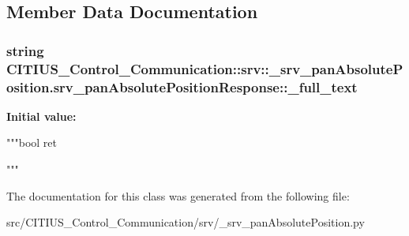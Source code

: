 \subsection{\-Member \-Data \-Documentation}
\hypertarget{class_c_i_t_i_u_s___control___communication_1_1srv_1_1__srv__pan_absolute_position_1_1srv__pan_absolute_position_response_aafd190c1627183f2e7c578017e63cb1c}{
\subsubsection[{\-\_\-full\-\_\-text}]{\setlength{\rightskip}{0pt plus 5cm}string \-C\-I\-T\-I\-U\-S\-\_\-\-Control\-\_\-\-Communication\-::srv\-::\-\_\-srv\-\_\-pan\-Absolute\-Position.\-srv\-\_\-pan\-Absolute\-Position\-Response\-::\-\_\-full\-\_\-text}}\label{class_c_i_t_i_u_s___control___communication_1_1srv_1_1__srv__pan_absolute_position_1_1srv__pan_absolute_position_response_aafd190c1627183f2e7c578017e63cb1c}
{\bfseries \-Initial value\-:}
\begin{DoxyCode}
"""bool ret


"""
\end{DoxyCode}


\-The documentation for this class was generated from the following file\-:\begin{DoxyCompactItemize}
\item 
src/\-C\-I\-T\-I\-U\-S\-\_\-\-Control\-\_\-\-Communication/srv/\-\_\-srv\-\_\-pan\-Absolute\-Position.\-py\end{DoxyCompactItemize}
